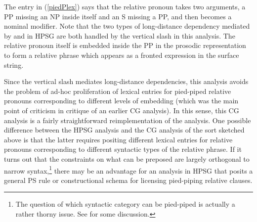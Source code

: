 \documentclass[output=paper,biblatex,babelshorthands,newtxmath,draftmode,colorlinks,citecolor=brown]{langscibook}
\begin{document}
\begin{exe}
 \ex\label{piedPlex}
  \oneline{\LexEnt{\pt{\ensuremath{\lambda} \ensuremath{\greeks_1} \ensuremath{\lambda} \ensuremath{\greeks_2}. \ensuremath{\greeks_1}(whom) \ensuremath{\circ}\xspace \ensuremath{\greeks_2}(\E)}}{\sem{ \lambda F \lambda P \lambda Q \lambda x. P(F(x)) \ensuremath{ \wedge\xspace } Q(x)}}{\syncat{(N\ensuremath{\backslash}{}N)\vs (S\vs PP)\vs (PP\vs NP)}}}
\end{exe}
The entry in (\ref{piedPlex}) says that the relative pronoun takes two
arguments, a PP missing an NP inside itself and an S missing a PP, and
then becomes a nominal modifier. Note that the two types of
long-distance dependency mediated by \REL and \SLASH in HPSG are both handled
by the vertical slash in this analysis. The relative pronoun itself is
embedded inside the PP in the prosodic representation to form a relative phrase
which appears as a fronted expression in the surface string.

Since the vertical slash mediates long-distance dependencies, this
analysis avoids the problem of ad-hoc proliferation of lexical entries 
for pied-piped relative pronouns corresponding to different levels of
embedding (which was the main point of criticism in
 critique of an earlier CG analysis). In this
sense, this CG analysis is a fairly straightforward reimplementation
of the \citet{ps2} analysis. One possible difference between
the HPSG analysis 
and the CG analysis of the sort sketched above is that the latter
requires positing different lexical entries for relative pronouns
corresponding to different syntactic types of the relative phrase. If
it turns out that the constraints on what can be preposed are largely
orthogonal to narrow syntax,\footnote{The question of which syntactic
category can be pied-piped is actually a rather thorny issue. See
 for some
discussion.} there may be an advantage for an analysis in HPSG that
posits a general PS rule or constructional schema for licensing pied-piping
relative clauses.\label{cg:page-pied-piping-end}


\end{document}
